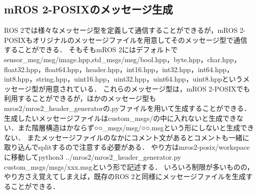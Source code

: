 \subsection{mROS 2-POSIXのメッセージ生成}
ROS 2では様々なメッセージ型を定義して通信することができるが，mROS 2-POSIXもオリジナルのメッセージファイルを用意してそのメッセージ型で通信することができる．
そもそもmROS 2にはデフォルトでsensor\_msg/msg/image.hpp,std\_msgs/msg/bool.hpp，byte.hpp，char.hpp，float32.hpp，float64.hpp，header.hpp，int16.hpp，int32.hpp，int64.hpp，int8.hpp，string.hpp，uint16.hpp，uint32.hpp，uint64.hpp，uint8.hppというメッセージ型が用意されている．
これらのメッセージ型は，mROS 2-POSIXでも利用することができるが，ほかのメッセージ型もmros2/mros2\_header\_generatorの.pyファイルを用いて生成することができる．
生成したいメッセージファイルはcustom\_msgs/の中に入れないと生成できない．また階層構造はかならず○○\_msgs/msg/○○.msgという形にしないと生成できない．
またメッセージファイルのなかにコメント文があるとコメントも一緒に取り込んでsplitするので注意する必要がある．
やり方はmros2-posix/workspaceに移動してpython3 ../mros2/mros2\_header\_generator.py custom\_msgs/msgs/xxx.msgという形で記述する．
いろいろ制限が多いものの，やり方さえ覚えてしまえば，既存のROS 2と同様にメッセージファイルを生成することができる．